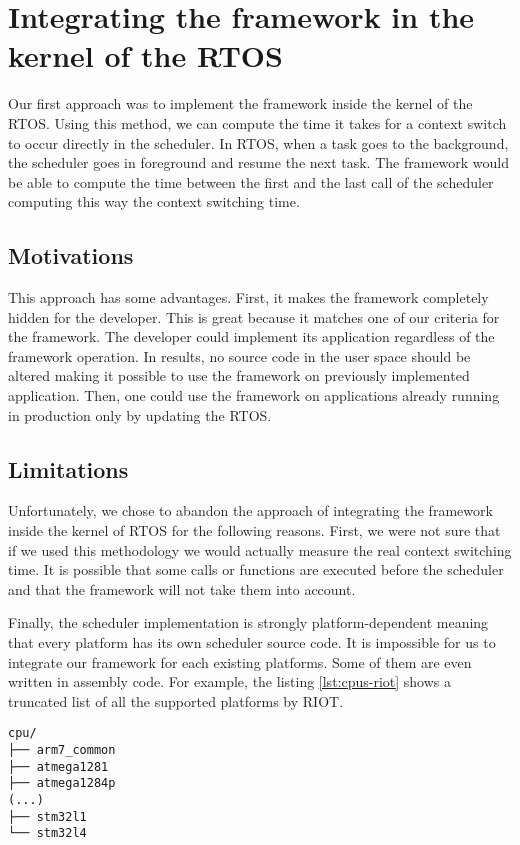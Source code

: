 \section{Integrating the framework in the kernel of the RTOS \label{sec:kernel}}

Our first approach was to implement the framework inside the kernel of the RTOS.
Using this method, we can compute the time it takes for a context switch to occur directly in the scheduler.
In RTOS, when a task goes to the background, the scheduler goes in foreground and resume the next task.
The framework would be able to compute the time between the first and the last call of the scheduler computing this way the context switching time.

\subsection{Motivations}

This approach has some advantages.
First, it makes the framework completely hidden for the developer.
This is great because it matches one of our criteria for the framework.
The developer could implement its application regardless of the framework operation.
In results, no source code in the user space should be altered making it possible to use the framework on previously implemented application.
Then, one could use the framework on applications already running in production only by updating the RTOS.

\subsection{Limitations}

Unfortunately, we chose to abandon the approach of integrating the framework inside the kernel of RTOS for the following reasons.
First, we were not sure that if we used this methodology we would actually measure the real context switching time.
It is possible that some calls or functions are executed before the scheduler and that the framework will not take them into account.

Finally, the scheduler implementation is strongly platform-dependent meaning that every platform has its own scheduler source code.
It is impossible for us to integrate our framework for each existing platforms.
Some of them are even written in assembly code.
For example, the listing \ref{lst:cpus-riot} shows a truncated list of all the supported platforms by RIOT.

\begin{lstlisting}[style=ascii-tree, label={lst:cpus-riot}, caption={truncated list of platforms supported by RIOT}]
cpu/
├── arm7_common
├── atmega1281
├── atmega1284p
(...)
├── stm32l1
└── stm32l4
\end{lstlisting}